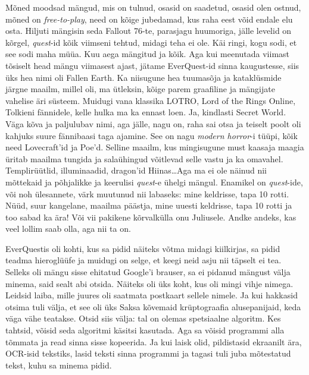 Mõned moodsad mängud, mis on tulnud, osasid on saadetud, osasid olen ostnud, 
mõned on \emph{free-to-play}, need on kõige jubedamad, kus raha eest võid 
endale elu osta. Hiljuti mängisin seda Fallout 76-te, parasjagu huumoriga, 
jälle  levelid on kõrgel, \emph{quest}-id kõik viimseni tehtud, midagi teha ei 
ole. Käi ringi, kogu sodi, et see sodi maha müüa. Kuu aega mängitud ja kõik. 
Aga kui meenutada viimast tõsiselt head mängu viimasest ajast, jätame 
EverQuest-id sinna kaugustesse, siis üks hea nimi oli Fallen Earth. Ka 
niisugune hea  tuumasõja ja kataklüsmide järgne maailm, millel oli, ma 
ütleksin, kõige parem graafiline ja mängijate vahelise äri süsteem. Muidugi 
vana klassika LOTRO, Lord of the Rings Online, Tolkieni fännidele, kelle hulka 
ma ka ennast loen. Ja, kindlasti Secret World. Väga kõva ja paljulubav nimi, 
aga jälle, nagu on, raha sai otsa ja teiselt poolt oli kahjuks suure fännibaasi 
taga ajamine. See on nagu \emph{modern horror}-i tüüpi,  kõik need Lovecraft'id 
ja Poe'd. Selline maailm, kus mingisugune must kaasaja maagia üritab  maailma 
tungida ja salaühingud võitlevad selle vastu ja ka omavahel. Templirüütlid, 
illuminaadid, dragon'id Hiinas\ldots  Aga ma ei ole näinud nii mõttekaid ja 
põhjalikke ja keerulisi \emph{quest}-e ühelgi mängul. Enamikel on 
\emph{quest}-ide, või noh ülesannete, värk muutunud nii labaseks: mine 
keldrisse, tapa 10 rotti. Nüüd, suur kangelane, maailma päästja, mine uuesti 
keldrisse, tapa 10 rotti ja too sabad ka ära! Või vii pakikene kõrvalkülla onu 
Juliusele. Andke andeks, kas veel lollim saab olla, aga nii ta on.

EverQuestis oli kohti, kus sa pidid näiteks võtma midagi kiilkirjas, sa pidid 
teadma  hieroglüüfe ja muidugi on selge, et keegi neid asju nii täpselt ei tea. 
Selleks oli mängu sisse ehitatud Google'i brauser, sa ei pidanud mängust välja 
minema, said sealt abi otsida. Näiteks oli üks koht, kus oli mingi vihje 
nimega. Leidsid laiba, mille juures oli saatmata postkaart sellele nimele. Ja 
kui hakkasid otsima tuli välja, et see oli üks Saksa kõvemaid krüptograafia 
alusepanijaid, keda väga vähe teatakse. Otsid siis välja: tal on olemas 
spetsiaalne algoritm. Kes tahtsid, võisid seda algoritmi käsitsi kasutada. Aga 
sa võisid  programmi alla tõmmata ja read sinna sisse kopeerida. Ja kui laisk 
olid, pildistasid ekraanilt ära, OCR-isid tekstiks, lasid teksti sinna 
programmi ja tagasi tuli juba mõtestatud tekst, kuhu sa minema pidid.
